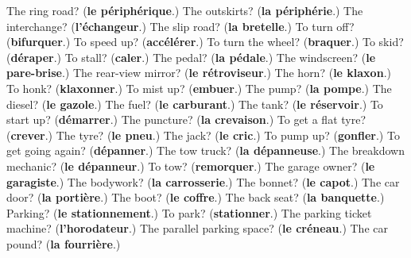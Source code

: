\begin{tcolorbox}[breakable,colback=teal!4,colframe=teal!35!black,title={Before you move on}]
The ring road? (\textbf{le périphérique}.) The outskirts? (\textbf{la périphérie}.) The interchange? (\textbf{l'échangeur}.) The slip road? (\textbf{la bretelle}.) To turn off? (\textbf{bifurquer}.) To speed up? (\textbf{accélérer}.) To turn the wheel? (\textbf{braquer}.) To skid? (\textbf{déraper}.) To stall? (\textbf{caler}.) The pedal? (\textbf{la pédale}.) The windscreen? (\textbf{le pare-brise}.) The rear-view mirror? (\textbf{le rétroviseur}.) The horn? (\textbf{le klaxon}.) To honk? (\textbf{klaxonner}.) To mist up? (\textbf{embuer}.) The pump? (\textbf{la pompe}.) The diesel? (\textbf{le gazole}.) The fuel? (\textbf{le carburant}.) The tank? (\textbf{le réservoir}.) To start up? (\textbf{démarrer}.) The puncture? (\textbf{la crevaison}.) To get a flat tyre? (\textbf{crever}.) The tyre? (\textbf{le pneu}.) The jack? (\textbf{le cric}.) To pump up? (\textbf{gonfler}.) To get going again? (\textbf{dépanner}.) The tow truck? (\textbf{la dépanneuse}.) The breakdown mechanic? (\textbf{le dépanneur}.) To tow? (\textbf{remorquer}.) The garage owner? (\textbf{le garagiste}.) The bodywork? (\textbf{la carrosserie}.) The bonnet? (\textbf{le capot}.) The car door? (\textbf{la portière}.) The boot? (\textbf{le coffre}.) The back seat? (\textbf{la banquette}.) Parking? (\textbf{le stationnement}.) To park? (\textbf{stationner}.) The parking ticket machine? (\textbf{l'horodateur}.) The parallel parking space? (\textbf{le créneau}.) The car pound? (\textbf{la fourrière}.)
\end{tcolorbox}
